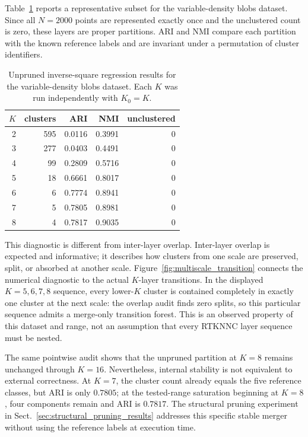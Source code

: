 \documentclass[pdflatex,sn-mathphys-num]{sn-jnl}
\begin{document}
Table~\ref{tab:partition_diagnostic} reports a representative subset for the variable-density blobs dataset. Since all $N=2000$ points are represented exactly once and the unclustered count is zero, these layers are proper partitions. ARI and NMI compare each partition with the known reference labels and are invariant under a permutation of cluster identifiers.

\begin{table}[t]
\caption{Unpruned inverse-square regression results for the variable-density blobs dataset. Each $K$ was run independently with $K_0=K$.}\label{tab:partition_diagnostic}
\centering
\begin{tabular}{rrrrr}
\toprule
$K$ & clusters & ARI & NMI & unclustered\\
\midrule
2 & 595 & 0.0116 & 0.3991 & 0\\
3 & 277 & 0.0403 & 0.4491 & 0\\
4 & 99  & 0.2809 & 0.5716 & 0\\
5 & 18  & 0.6661 & 0.8017 & 0\\
6 & 6   & 0.7774 & 0.8941 & 0\\
7 & 5   & 0.7805 & 0.8981 & 0\\
8 & 4   & 0.7817 & 0.9035 & 0\\
\bottomrule
\end{tabular}
\end{table}

This diagnostic is different from inter-layer overlap. Inter-layer overlap is
expected and informative; it describes how clusters from one scale are
preserved, split, or absorbed at another scale.  Figure~\ref{fig:multiscale_transition}
connects the numerical diagnostic to the actual $K$-layer transitions.  In the
displayed $K=5,6,7,8$ sequence, every lower-$K$ cluster is contained completely
in exactly one cluster at the next scale: the overlap audit finds zero splits,
so this particular sequence admits a merge-only transition forest.  This is an
observed property of this dataset and range, not an assumption that every
RTKNNC layer sequence must be nested.

The same pointwise audit shows that the unpruned partition at $K=8$ remains
unchanged through $K=16$.  Nevertheless, internal stability is not equivalent
to external correctness.  At $K=7$, the cluster count already equals the five
reference classes, but ARI is only $0.7805$; at the tested-range saturation
beginning at $K=8$, four components remain and ARI is $0.7817$.  The structural
pruning experiment in Sect.~\ref{sec:structural_pruning_results} addresses this
specific stable merger without using the reference labels at execution time.
\end{document}
